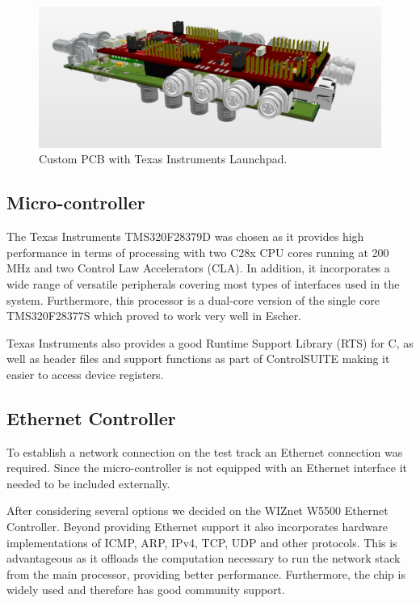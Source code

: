 \begin{figure}[H]
  \centering \includegraphics[width=1.0\textwidth]{./figures/pcb.png}
  \caption{Custom PCB with Texas Instruments Launchpad.}
\end{figure}

\subsection{Micro-controller}

The Texas Instruments TMS320F28379D was chosen as it provides high performance in terms of processing with two C28x CPU cores running at 200 MHz and two Control Law Accelerators (CLA). In addition, it incorporates a wide range of versatile peripherals covering most types of interfaces used in the system. Furthermore, this processor is a dual-core version of the single core TMS320F28377S which proved to work very well in Escher.

Texas Instruments also provides a good Runtime Support Library (RTS) for C, as well as header files and support functions as part of ControlSUITE making it easier to access device registers.

\subsection{Ethernet Controller}

To establish a network connection on the test track an Ethernet connection was required. Since the micro-controller is not equipped with an Ethernet interface it needed to be included externally.

After considering several options we decided on the WIZnet W5500 Ethernet Controller. Beyond providing Ethernet support it also incorporates hardware implementations of ICMP, ARP, IPv4, TCP, UDP and other protocols. This is advantageous as it offloads the computation necessary to run the network stack from the main processor, providing better performance. Furthermore, the chip is widely used and therefore has good community support.

